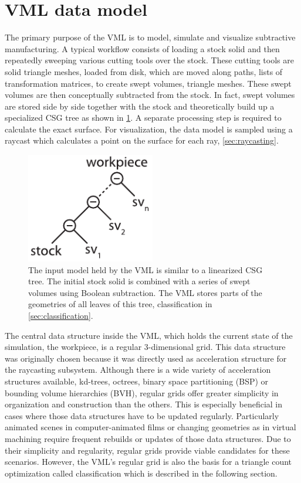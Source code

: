 \section{VML data model}
\label{sec:vml_data_model}

The primary purpose of the VML is to model, simulate and visualize subtractive manufacturing.
A typical workflow consists of loading a stock solid and then repeatedly sweeping various cutting tools over the stock.
These cutting tools are solid triangle meshes, loaded from disk, which are moved along paths, \ie lists of transformation matrices, to create swept volumes, \ie triangle meshes.
These swept volumes are then conceptually subtracted from the stock.
In fact, swept volumes are stored side by side together with the stock and theoretically build up a specialized CSG tree as shown in \cref{fig:vml_csg}.
A separate processing step is required to calculate the exact surface.
For visualization, the data model is sampled using a raycast which calculates a point on the surface for each ray, \cf \cref{sec:raycasting}.

\begin{figure}[h]
	\centering
	\includegraphics[width=0.5\textwidth]{images/vml_csg}
	\caption{
		The input model held by the VML is similar to a linearized CSG tree.
		The initial stock solid is combined with a series of swept volumes using Boolean subtraction.
		The VML stores parts of the geometries of all leaves of this tree, \cf classification in \cref{sec:classification}.
	}
	\label{fig:vml_csg}
\end{figure}


The central data structure inside the VML, which holds the current state of the simulation, \ie the workpiece, is a regular 3-dimensional grid.
This data structure was originally chosen because it was directly used as acceleration structure for the raycasting subsystem.
Although there is a wide variety of acceleration structures available, \eg kd-trees, octrees, binary space partitioning (BSP) or bounding volume hierarchies (BVH), regular grids offer greater simplicity in organization and construction than the others.
This is especially beneficial in cases where those data structures have to be updated regularly.
Particularly animated scenes in computer-animated films or changing geometries as in virtual machining require frequent rebuilds or updates of those data structures.
Due to their simplicity and regularity, regular grids provide viable candidates for these scenarios.
However, the VML's regular grid is also the basis for a triangle count optimization called classification which is described in the following section.


